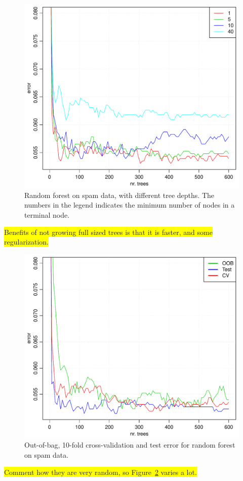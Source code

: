 \begin{figure}[h!]
\begin{center}
    \includegraphics[scale=0.5]{./figures/RFTreeDepth.pdf}
\end{center}
\caption{Random forest on spam data, with different tree depths. The numbers in the legend indicates the minimum number of nodes in a terminal node.}
\label{fig:RFTreeDepth}
\end{figure}
\colorbox{yellow}{Benefits of not growing full sized trees is that it is faster, and some regularization.}


\begin{figure}[h!]
\begin{center}
    \includegraphics[scale=0.5]{./figures/OOBvsTestvsCV.pdf}
\end{center}
\caption{Out-of-bag, 10-fold cross-validation and test error for random forest on spam data.}
\label{fig:OOBvsTestvsCV}
\end{figure}
\colorbox{yellow}{Comment how they are very random, so Figure~\ref{fig:OOBvsTestvsCV} varies a lot.}\\






